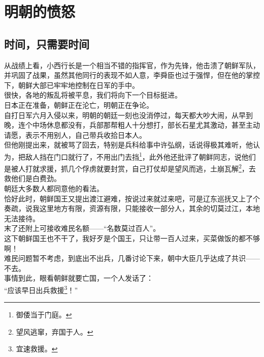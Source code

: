 \section{明朝的愤怒}
\ifnum{}
	\begin{multicols}{\theparacolNo}
\fi
\subsection{时间，只需要时间}
从战绩上看，小西行长是一个相当不错的指挥官，作为先锋，他击溃了朝鲜军队，并巩固了战果，虽然其他同行的表现不如人意，李舜臣也过于强悍，但在他的掌控下，朝鲜大部已牢牢地控制在日军的手中。\\

很快，各地的叛乱将被平息，我们将向下一个目标挺进。\\

日本正在准备，朝鲜正在沦亡，明朝正在争论。\\

自打日军六月入侵以来，明朝的朝廷一刻也没消停过，每天都大吵大闹，从早到晚，连个中场休息都没有，兵部那帮粗人十分想打，部长石星尤其激动，甚至主动请愿，表示不用别人，自己带兵收拾日本人。\\

但他刚提出来，就被骂了回去，特别是兵科给事中许弘纲，话说得极其难听，他认为，把敌人挡在门口就行了，不用出门去挡\footnote{御倭当于门庭。}，此外他还批评了朝鲜同志，说他们是被人打就求援，抓几个俘虏就要封赏，自己打仗却是望风而逃，土崩瓦解\footnote{望风逃窜，弃国于人。}，去救他们是白费劲。\\

朝廷大多数人都同意他的看法。\\

恰好此时，朝鲜国王又提出渡江避难，按说过来就过来吧，可是辽东巡抚又上了个奏疏，说我这里地方有限，资源有限，只能接收一部分人，其余的切莫过江，本地无法接待。\\

末了还附上可接收难民名额——“名数莫过百人”。\\

这下朝鲜国王也不干了，我好歹是个国王，只让带一百人过来，买菜做饭的都不够啊！\\

难民问题暂不考虑，到底出不出兵，几番讨论下来，朝中大臣几乎达成了共识——不去。\\

事情到此，眼看朝鲜就要亡国，一个人发话了：\\

“应该早日出兵救援\footnote{宜速救援。}！”\\


\end{multicols}
